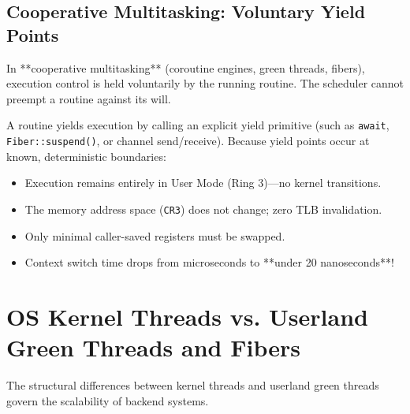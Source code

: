 \subsection{Cooperative Multitasking: Voluntary Yield Points}

In **cooperative multitasking** (coroutine engines, green threads, fibers), execution control is held voluntarily by the running routine. The scheduler cannot preempt a routine against its will.

A routine yields execution by calling an explicit yield primitive (such as \texttt{await}, \texttt{Fiber::suspend()}, or channel send/receive). Because yield points occur at known, deterministic boundaries:
\begin{itemize}[leftmargin=15pt]
  \item Execution remains entirely in User Mode (Ring 3)—no kernel transitions.
  \item The memory address space (\texttt{CR3}) does not change; zero TLB invalidation.
  \item Only minimal caller-saved registers must be swapped.
  \item Context switch time drops from microseconds to **under 20 nanoseconds**!
\end{itemize}

\section{OS Kernel Threads vs. Userland Green Threads and Fibers}

The structural differences between kernel threads and userland green threads govern the scalability of backend systems.

